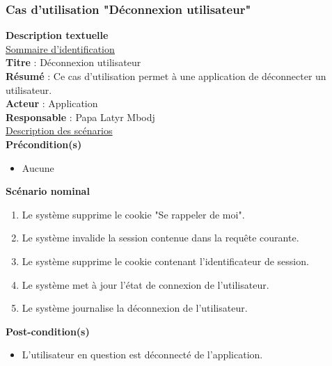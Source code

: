 \subsubsection{Cas d'utilisation "Déconnexion utilisateur"}
\textbf{\RIGHTarrow Description textuelle}\\
\underline{\underline{Sommaire d’identification}} \\
\textbf{Titre} : Déconnexion utilisateur\\
\textbf{Résumé} : Ce cas d’utilisation permet à une application de déconnecter un utilisateur.\\
\textbf{Acteur} : Application\\	
\textbf{Responsable} : Papa Latyr Mbodj\\
\underline{\underline{Description des scénarios}}\\
\textbf{Précondition(s)}
\begin{itemize}
	\item Aucune
\end{itemize}
\textbf{Scénario nominal}
\begin{enumerate}
	\item Le système supprime le cookie "Se rappeler de moi".
	\item Le système invalide la session contenue dans la requête courante.
	\item Le système supprime le cookie contenant l'identificateur de session.
	\item Le système met à jour l'état de connexion de l'utilisateur.
	\item Le système journalise la déconnexion de l'utilisateur.
\end{enumerate}
\textbf{Post-condition(s)}
\begin{itemize}
	\item L’utilisateur en question est déconnecté de l'application.
\end{itemize}

